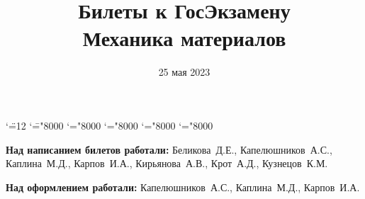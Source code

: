 \documentclass[a4paper, 12pt]{article} %
\begin{document}

\begingroup \catcode`\"=12
\gdef\newmcodes@{\mathcode`\'39\mathcode`\*42\mathcode`\."613A%
\mathcode`\-"8000\mathcode`\/47\mathcode`\:"603A\relax}%
\endgroup
\mathcode`\=="8000 \mathcode`\+="8000 \mathcode`\-="8000
\mathcode`\<="8000 \mathcode`\>="8000

\graphicspath{{images/}}

\title{Билеты к ГосЭкзамену \\ Механика материалов}
\date{25 мая 2023}

\maketitle

\pagebreak
\hspace{0pt}
\vfill
\begin{center}
    \textbf{Над написанием билетов работали:} \mbox{Беликова Д.Е.}, \mbox{Капелюшников А.С.}, \mbox{Каплина М.Д.}, \mbox{Карпов И.А.}, \mbox{Кирьянова А.В.}, \mbox{Крот А.Д.}, \mbox{Кузнецов К.М.}

    \textbf{Над оформлением работали:} \mbox{Капелюшников А.С.}, \mbox{Каплина М.Д.}, \mbox{Карпов И.А.}
\end{center}

\vfill
\hspace{0pt}
\pagebreak

\tableofcontents





\end{document}
